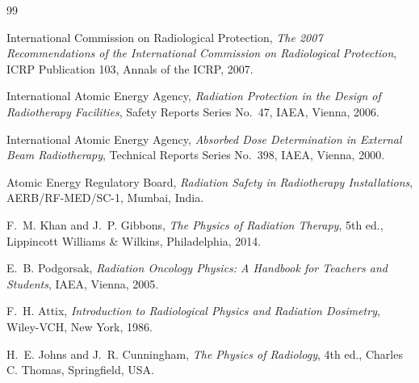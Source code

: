 \begin{thebibliography}{99}

International Commission on Radiological Protection,
\textit{The 2007 Recommendations of the International Commission on Radiological Protection},
ICRP Publication 103, Annals of the ICRP, 2007.

International Atomic Energy Agency,
\textit{Radiation Protection in the Design of Radiotherapy Facilities},
Safety Reports Series No.~47, IAEA, Vienna, 2006.

International Atomic Energy Agency,
\textit{Absorbed Dose Determination in External Beam Radiotherapy},
Technical Reports Series No.~398, IAEA, Vienna, 2000.

Atomic Energy Regulatory Board,
\textit{Radiation Safety in Radiotherapy Installations},
AERB/RF-MED/SC-1, Mumbai, India.

F.~M. Khan and J.~P. Gibbons,
\textit{The Physics of Radiation Therapy},
5th ed., Lippincott Williams \& Wilkins, Philadelphia, 2014.

E.~B. Podgorsak,
\textit{Radiation Oncology Physics: A Handbook for Teachers and Students},
IAEA, Vienna, 2005.

F.~H. Attix,
\textit{Introduction to Radiological Physics and Radiation Dosimetry},
Wiley-VCH, New York, 1986.

H.~E. Johns and J.~R. Cunningham,
\textit{The Physics of Radiology},
4th ed., Charles C. Thomas, Springfield, USA.

\end{thebibliography}
